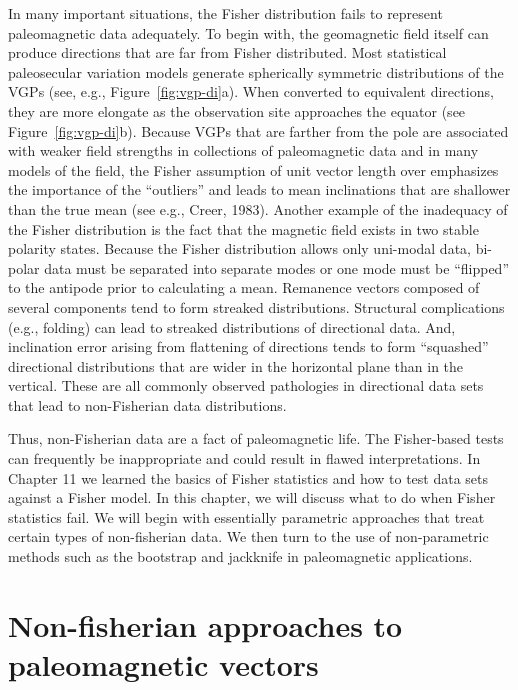In many important
situations, the 
Fisher distribution fails to represent paleomagnetic data adequately.
To begin with, the geomagnetic field itself can produce directions that are far from Fisher distributed.    Most statistical paleosecular variation models generate spherically symmetric distributions of the VGPs (see, e.g., Figure~\ref{fig:vgp-di}a).   When converted to equivalent directions, they are more elongate as the observation site approaches the equator (see Figure~\ref{fig:vgp-di}b).      Because VGPs that are farther from the pole are associated with weaker field strengths in collections of paleomagnetic data and in many models of the field,  the Fisher assumption of unit vector length over emphasizes the importance of the ``outliers'' and leads to mean inclinations that are shallower than the true mean (see e.g., 
Creer, 1983).  \nocite{creer83} 
Another example of the inadequacy of the Fisher distribution is the fact that the magnetic field exists in two stable 
polarity states.  Because the
 Fisher
distribution allows only uni-modal data, bi-polar data must be separated into separate modes  or one mode must be ``flipped'' to the antipode prior to calculating a mean.  
Remanence vectors composed of
several components tend to form streaked distributions. Structural complications (e.g., folding) can lead to streaked
distributions of directional data.  And, inclination error arising from flattening of directions tends to form ``squashed'' directional distributions that are wider in the horizontal plane than in the vertical.   These are all commonly observed pathologies in directional data sets that lead to non-Fisherian data distributions.   
 
  Thus,
 non-Fisherian data are a fact of paleomagnetic life.  
 The Fisher-based tests can frequently be inappropriate and could 
result in  flawed interpretations.
In Chapter 11 we learned the basics of Fisher statistics and
how to test data sets against a Fisher model.  In this chapter,
we will discuss what to do when Fisher statistics fail.  We will begin with essentially parametric approaches that treat certain types of non-fisherian data.  We then turn to the use of  non-parametric methods such as the   bootstrap and jackknife in paleomagnetic applications.   

\section {Non-fisherian approaches to paleomagnetic vectors}
    
